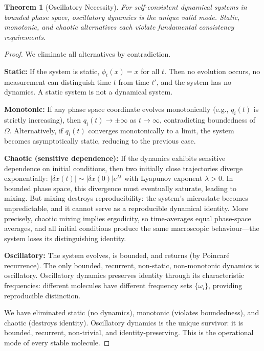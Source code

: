 \documentclass[11pt,a4paper]{article}
\newtheorem{theorem}{Theorem}[section]
\theoremstyle{definition}
\theoremstyle{remark}
\begin{document}
\begin{theorem}[Oscillatory Necessity]
\label{thm:oscillatory}
For self-consistent dynamical systems in bounded phase space, oscillatory dynamics is the unique valid mode. Static, monotonic, and chaotic alternatives each violate fundamental consistency requirements.
\end{theorem}

\begin{proof}
We eliminate all alternatives by contradiction.

\textbf{Static:} If the system is static, $\phi_t(x) = x$ for all $t$. Then no evolution occurs, no measurement can distinguish time $t$ from time $t'$, and the system has no dynamics. A static system is not a dynamical system.

\textbf{Monotonic:} If any phase space coordinate evolves monotonically (e.g., $q_i(t)$ is strictly increasing), then $q_i(t) \to \pm \infty$ as $t \to \infty$, contradicting boundedness of $\Omega$. Alternatively, if $q_i(t)$ converges monotonically to a limit, the system becomes asymptotically static, reducing to the previous case.

\textbf{Chaotic (sensitive dependence):} If the dynamics exhibits sensitive dependence on initial conditions, then two initially close trajectories diverge exponentially: $|\delta x(t)| \sim |\delta x(0)| e^{\lambda t}$ with Lyapunov exponent $\lambda > 0$. In bounded phase space, this divergence must eventually saturate, leading to mixing. But mixing destroys reproducibility: the system's microstate becomes unpredictable, and it cannot serve as a reproducible dynamical identity. More precisely, chaotic mixing implies ergodicity, so time-averages equal phase-space averages, and all initial conditions produce the same macroscopic behaviour---the system loses its distinguishing identity.

\textbf{Oscillatory:} The system evolves, is bounded, and returns (by Poincar\'e recurrence). The only bounded, recurrent, non-static, non-monotonic dynamics is oscillatory. Oscillatory dynamics preserves identity through its characteristic frequencies: different molecules have different frequency sets $\{\omega_i\}$, providing reproducible distinction.

We have eliminated static (no dynamics), monotonic (violates boundedness), and chaotic (destroys identity). Oscillatory dynamics is the unique survivor: it is bounded, recurrent, non-trivial, and identity-preserving. This is the operational mode of every stable molecule.
\end{proof}
\end{document}
